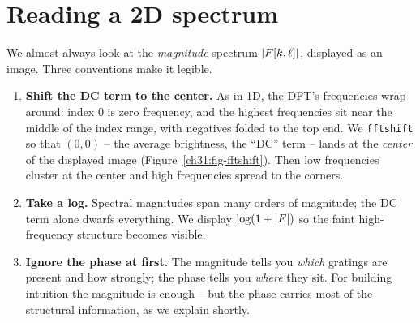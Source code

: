\section{Reading a 2D spectrum}
\label{ch31:reading}
We almost always look at the \emph{magnitude} spectrum $\lvert F[k,\ell]\rvert$, displayed
as an image. Three conventions make it legible.
\begin{enumerate}
\item \textbf{Shift the DC term to the center.} As in 1D, the DFT's frequencies
wrap around: index $0$ is zero frequency, and the highest frequencies sit near the
middle of the index range, with negatives folded to the top end. We
\texttt{fftshift} so that $(0,0)$ -- the average brightness, the ``DC'' term --
lands at the \emph{center} of the displayed image (Figure~\ref{ch31:fig-fftshift}).
Then low frequencies cluster at the center and high frequencies spread to the corners.
\item \textbf{Take a log.} Spectral magnitudes span many orders of magnitude; the
DC term alone dwarfs everything. We display $\log(1+\lvert F\rvert)$ so the faint
high-frequency structure becomes visible.
\item \textbf{Ignore the phase at first.} The magnitude tells you \emph{which}
gratings are present and how strongly; the phase tells you \emph{where} they sit.
For building intuition the magnitude is enough -- but the phase carries most of
the structural information, as we explain shortly.
\end{enumerate}
